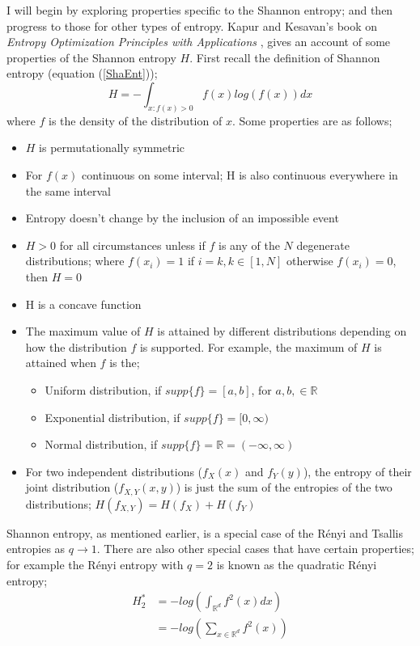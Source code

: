 \documentclass{report}
\begin{document}
I will begin by exploring properties specific to the Shannon entropy; and then progress to those for other types of entropy. Kapur and Kesavan's book on \textit{Entropy Optimization Principles with Applications} \cite{paper8}, gives an account of some properties of the Shannon entropy $H$. First recall the definition of Shannon entropy (equation (\ref{ShaEnt}));
\begin{equation}
H = - \int_{x : f(x) > 0} f(x) log(f(x)) dx \nonumber
\end{equation}
where $f$ is the density of the distribution of $x$. Some properties are as follows; 
\begin{itemize}
\item $H$ is permutationally symmetric
\item For $f(x)$ continuous on some interval; H is also continuous everywhere in the same interval
\item Entropy doesn't change by the inclusion of an impossible event
\item $H > 0$ for all circumstances unless if $f$ is any of the $N$ degenerate distributions; where $f(x_{i}) = 1$ if $i = k, k \in [1, N]$ otherwise $f(x_{i}) = 0$, then $H=0$
\item H is a concave function
\item The maximum value of $H$ is attained by different distributions depending on how the distribution $f$ is supported. For example, the maximum of $H$ is attained when $f$ is the;
\begin{itemize}
\item	Uniform distribution, if $supp\{f\} = [a, b]$, for $a, b, \in \mathbb{R}$
\item	Exponential distribution, if $supp\{f\} = [0, \infty)$
\item	Normal distribution, if $supp\{f\} = \mathbb{R} = (-\infty, \infty)$	
\end{itemize}
\item For two independent distributions ($f_{X}(x)$ and $f_{Y}(y)$), the entropy of their joint distribution ($f_{X,Y}(x,y)$) is just the sum of the entropies of the two distributions; $H(f_{X,Y}) = H(f_{X}) + H(f_{Y})$
\end{itemize}

Shannon entropy, as mentioned earlier, is a special case of the R\'enyi and Tsallis entropies as $q \to 1$. There are also other special cases that have certain properties; for example the R\'enyi entropy with $q=2$ is known as the quadratic R\'enyi entropy;
\begin{align} 
H_{2}^{*} &= - log\left( \int_{\mathbb{R}^{d}} f^2(x) dx \right) \label{QuadRenEnt} \\
&= - log \left( \sum_{x \in \mathbb{R}^d} f^2 (x) \right) \nonumber 
\end{align}
\end{document}
